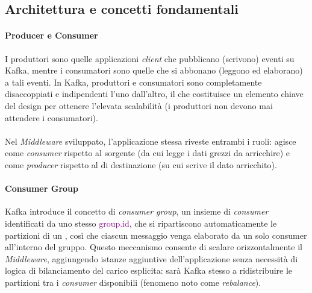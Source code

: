 \subsection{Architettura e concetti fondamentali}
\label{Architettura e concetti fondamentali}
\paragraph{Producer e Consumer} I produttori sono quelle applicazioni \textit{client} che pubblicano (scrivono) eventi su Kafka, mentre i consumatori sono quelle che si abbonano (leggono ed elaborano) a tali eventi. 
In Kafka, produttori e consumatori sono completamente disaccoppiati e indipendenti l'uno dall'altro, il che costituisce un elemento chiave del design per ottenere l'elevata scalabilità (i produttori non devono mai attendere i consumatori). \\ \\
Nel \textit{Middleware} sviluppato, l'applicazione stessa riveste entrambi i ruoli: agisce come \textit{consumer} rispetto al \textit{} sorgente (da cui legge i dati grezzi da arricchire) e come \textit{producer} rispetto al \textit{} di destinazione (su cui scrive il dato arricchito).
\paragraph{Consumer Group} Kafka introduce il concetto di \textit{consumer group}, un insieme di \textit{consumer} identificati da uno stesso \textcolor{purple}{group.id}, che si ripartiscono automaticamente le partizioni di un \textit{}, così che ciascun messaggio venga elaborato da un solo consumer all'interno del gruppo. Questo meccanismo consente di scalare orizzontalmente il \textit{Middleware}, aggiungendo istanze aggiuntive dell'applicazione senza necessità di logica di bilanciamento del carico esplicita: sarà Kafka stesso a ridistribuire le partizioni tra i \textit{consumer} disponibili (fenomeno noto come \textit{rebalance}).
\newpage
